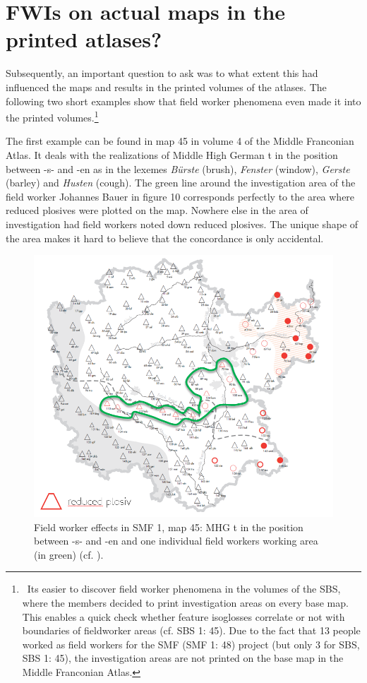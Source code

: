 \documentclass[output=paper]{LSP/langsci}
\begin{document}
\section{FWIs on actual maps in the printed atlases?}
Subsequently, an important question to ask was to what extent this had influenced the maps and results in the printed volumes of the atlases. The following two short examples show that field worker phenomena even made it into the printed volumes.\footnote{\ It{\textquotesingle}s easier to discover field worker phenomena in the volumes of the SBS, where the members decided to print investigation areas on every base map. This enables a quick check whether feature isoglosses correlate or not with boundaries of fieldworker areas (cf. SBS 1: 45). Due to the fact that 13 people worked as field workers for the SMF (SMF 1: 48) project (but only 3 for SBS, SBS 1: 45), the investigation areas are not printed on the base map in the Middle Franconian Atlas.}

The first example can be found in map 45 in volume 4 of the Middle Franconian Atlas. It deals with the realizations of Middle High German t in the position between -s- and -en as in the lexemes \textit{Bürste} ({\textquotesingle}brush{\textquotesingle}), \textit{Fenster} ({\textquotesingle}window{\textquotesingle}), \textit{Gerste} ({\textquotesingle}barley{\textquotesingle}) and \textit{Husten} ({\textquotesingle}cough{\textquotesingle}). The green line around the investigation area of the field worker Johannes Bauer in figure 10 corresponds perfectly to the area where reduced plosives were plotted on the map. Nowhere else in the area of investigation had field workers noted down reduced plosives. The unique shape of the area makes it hard to believe that the concordance is only accidental.

\begin{figure}
\includegraphics[width=.7\textwidth]{illustrations/mathus_fig11}
\caption{Field worker effects in SMF 1, map 45: MHG t in the position between -s- and -en and one individual field worker{\textquotesingle}s working area (in green) (cf. \citealt[240]{mathussek_sprachraume_2014}).}
\label{fig:11}
\end{figure}
\end{document}
